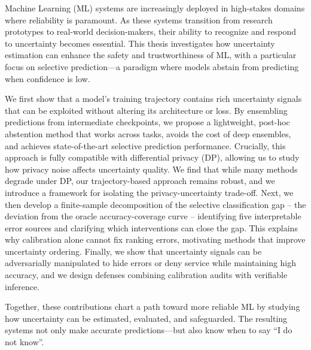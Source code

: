 

\noindent Machine Learning (ML) systems are increasingly deployed in high-stakes domains where reliability is paramount. As these systems transition from research prototypes to real-world decision-makers, their ability to recognize and respond to uncertainty becomes essential. This thesis investigates how uncertainty estimation can enhance the safety and trustworthiness of ML, with a particular focus on selective prediction—a paradigm where models abstain from predicting when confidence is low.

We first show that a model's training trajectory contains rich uncertainty signals that can be exploited without altering its architecture or loss. By ensembling predictions from intermediate checkpoints, we propose a lightweight, post-hoc abstention method that works across tasks, avoids the cost of deep ensembles, and achieves state-of-the-art selective prediction performance. Crucially, this approach is fully compatible with differential privacy (DP), allowing us to study how privacy noise affects uncertainty quality. We find that while many methods degrade under DP, our trajectory-based approach remains robust, and we introduce a framework for isolating the privacy-uncertainty trade-off. Next, we then develop a finite-sample decomposition of the selective classification gap -- the deviation from the oracle accuracy-coverage curve -- identifying five interpretable error sources and clarifying which interventions can close the gap. This explains why calibration alone cannot fix ranking errors, motivating methods that improve uncertainty ordering. Finally, we show that uncertainty signals can be adversarially manipulated to hide errors or deny service while maintaining high accuracy, and we design defenses combining calibration audits with verifiable inference.

Together, these contributions chart a path toward more reliable ML by studying how uncertainty can be estimated, evaluated, and safeguarded. The resulting systems not only make accurate predictions—but also know when to say “I do not know”.